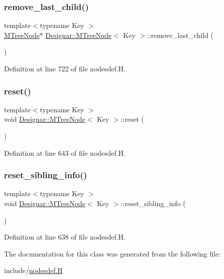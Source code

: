 \subsubsection{\texorpdfstring{remove\+\_\+last\+\_\+child()}{remove\_last\_child()}}
{\footnotesize\ttfamily template$<$typename Key $>$ \\
\hyperlink{class_designar_1_1_m_tree_node}{M\+Tree\+Node}$\ast$ \hyperlink{class_designar_1_1_m_tree_node}{Designar\+::\+M\+Tree\+Node}$<$ Key $>$\+::remove\+\_\+last\+\_\+child (\begin{DoxyParamCaption}{ }\end{DoxyParamCaption})\hspace{0.3cm}{\ttfamily [inline]}}



Definition at line 722 of file nodesdef.\+H.

\mbox{\label{class_designar_1_1_m_tree_node_a83e06dcf705a55bbf7a2963f7d95fdeb}} 
\subsubsection{\texorpdfstring{reset()}{reset()}}
{\footnotesize\ttfamily template$<$typename Key $>$ \\
void \hyperlink{class_designar_1_1_m_tree_node}{Designar\+::\+M\+Tree\+Node}$<$ Key $>$\+::reset (\begin{DoxyParamCaption}{ }\end{DoxyParamCaption})\hspace{0.3cm}{\ttfamily [inline]}}



Definition at line 643 of file nodesdef.\+H.

\mbox{\label{class_designar_1_1_m_tree_node_a7bbcaf3f2dc77eaf4c593e64ca20c5f0}} 
\subsubsection{\texorpdfstring{reset\+\_\+sibling\+\_\+info()}{reset\_sibling\_info()}}
{\footnotesize\ttfamily template$<$typename Key $>$ \\
void \hyperlink{class_designar_1_1_m_tree_node}{Designar\+::\+M\+Tree\+Node}$<$ Key $>$\+::reset\+\_\+sibling\+\_\+info (\begin{DoxyParamCaption}{ }\end{DoxyParamCaption})\hspace{0.3cm}{\ttfamily [inline]}}



Definition at line 638 of file nodesdef.\+H.



The documentation for this class was generated from the following file\+:\begin{DoxyCompactItemize}
\item 
include/\hyperlink{nodesdef_8_h}{nodesdef.\+H}\end{DoxyCompactItemize}
